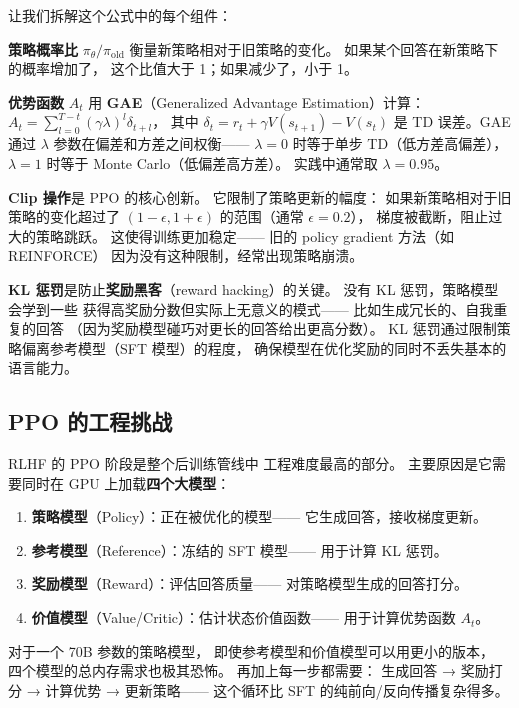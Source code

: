 让我们拆解这个公式中的每个组件：

\textbf{策略概率比} $\pi_\theta / \pi_{\mathrm{old}}$
衡量新策略相对于旧策略的变化。
如果某个回答在新策略下的概率增加了，
这个比值大于 1；如果减少了，小于 1。

\textbf{优势函数} $A_t$ 用
\textbf{GAE}（Generalized Advantage Estimation）计算：
$A_t = \sum_{l=0}^{T-t} (\gamma \lambda)^l \delta_{t+l}$，
其中 $\delta_t = r_t + \gamma V(s_{t+1}) - V(s_t)$
是 TD 误差。GAE 通过 $\lambda$ 参数在偏差和方差之间权衡——
$\lambda = 0$ 时等于单步 TD（低方差高偏差），
$\lambda = 1$ 时等于 Monte Carlo（低偏差高方差）。
实践中通常取 $\lambda = 0.95$。

\textbf{Clip 操作}是 PPO 的核心创新。
它限制了策略更新的幅度：
如果新策略相对于旧策略的变化超过了 $(1-\epsilon, 1+\epsilon)$
的范围（通常 $\epsilon = 0.2$），
梯度被截断，阻止过大的策略跳跃。
这使得训练更加稳定——
旧的 policy gradient 方法（如 REINFORCE）
因为没有这种限制，经常出现策略崩溃。

\textbf{KL 惩罚}是防止\textbf{奖励黑客}（reward hacking）的关键。
没有 KL 惩罚，策略模型会学到一些
获得高奖励分数但实际上无意义的模式——
比如生成冗长的、自我重复的回答
（因为奖励模型碰巧对更长的回答给出更高分数）。
KL 惩罚通过限制策略偏离参考模型（SFT 模型）的程度，
确保模型在优化奖励的同时不丢失基本的语言能力。

\subsection{PPO 的工程挑战}

RLHF 的 PPO 阶段是整个后训练管线中
工程难度最高的部分。
主要原因是它需要同时在 GPU 上加载\textbf{四个大模型}：
\begin{enumerate}[noitemsep]
  \item \textbf{策略模型}（Policy）：正在被优化的模型——
        它生成回答，接收梯度更新。
  \item \textbf{参考模型}（Reference）：冻结的 SFT 模型——
        用于计算 KL 惩罚。
  \item \textbf{奖励模型}（Reward）：评估回答质量——
        对策略模型生成的回答打分。
  \item \textbf{价值模型}（Value/Critic）：估计状态价值函数——
        用于计算优势函数 $A_t$。
\end{enumerate}

对于一个 70B 参数的策略模型，
即使参考模型和价值模型可以用更小的版本，
四个模型的总内存需求也极其恐怖。
再加上每一步都需要：
生成回答 → 奖励打分 → 计算优势 → 更新策略——
这个循环比 SFT 的纯前向/反向传播复杂得多。


